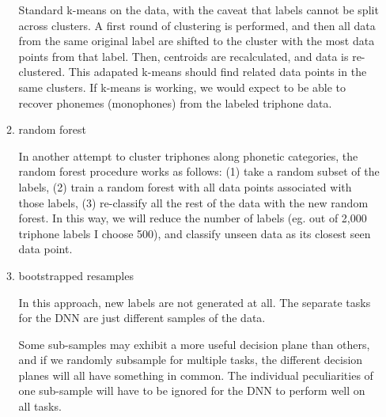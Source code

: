 \documentclass[10pt,a4paper]{article}
\begin{document}
\begin{enumerate}
\begin{enumerate}
    Standard k-means on the data, with the caveat that labels cannot be split across clusters. A first round of clustering is performed, and then all data from the same original label are shifted to the cluster with the most data points from that label. Then, centroids are recalculated, and data is re-clustered. This adapated k-means should find related data points in the same clusters. If k-means is working, we would expect to be able to recover phonemes (monophones) from the labeled triphone data.
    
  \item random forest

    In another attempt to cluster triphones along phonetic categories, the random forest procedure works as follows: (1) take a random subset of the labels, (2) train a random forest with all data points associated with those labels, (3) re-classify all the rest of the data with the new random forest. In this way, we will reduce the number of labels (eg. out of 2,000 triphone labels I choose 500), and classify unseen data as its closest seen data point.

  \item bootstrapped resamples

    In this approach, new labels are not generated at all. The separate tasks for the DNN are just different samples of the data.

    Some sub-samples may exhibit a more useful decision plane than others, and if we randomly subsample for multiple tasks, the different decision planes will all have something in common. The individual peculiarities of one sub-sample will have to be ignored for the DNN to perform well on all tasks.
    
  \end{enumerate}
\end{enumerate}
\end{document}
